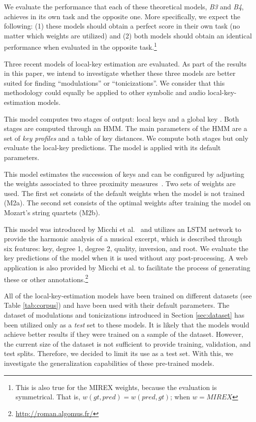 We evaluate the performance that each of these theoretical
models, \emph{B3} and \emph{B4}, achieves in its own task
and the opposite one. More specifically, we expect the
following: (1) these models should obtain a perfect score in
their own task (no matter which weights are utilized) and
(2) both models should obtain an identical performance when
evaluated in the opposite task.\footnote{This is also true
for the MIREX weights, because the evaluation is
symmetrical. That is, $w(gt, pred) = w(pred, gt)$; when
$w=MIREX$}

Three recent models of local-key estimation are evaluated.
As part of the results in this paper, we intend to
investigate whether these three models are better suited for
finding ``modulations'' or ``tonicizations''. We consider
that this methodology could equally be applied to other
symbolic and audio local-key-estimation models.

 This model computes
two stages of output: local keys and a global key
\cite{napoleslopez2019key}. Both stages are computed through
an HMM. The main parameters of the HMM are a set of
\emph{key profiles} and a table of key distances. We compute
both stages but only evaluate the local-key predictions. The
model is applied with its default parameters.

This model estimates the succession of keys and can be
configured by adjusting the weights associated to three
proximity measures~\cite{feisthauer2020smc}. Two sets of
weights are used. The first set consists of the default
weights when the model is not trained (M2a). The second set
consists of the optimal weights after training the model on
Mozart's string quartets (M2b).

This model was introduced by Micchi et
al.~\cite{micchi20roman} and utilizes an LSTM network to
provide the harmonic analysis of a musical excerpt, which is
described through six features: key, degree 1, degree 2,
quality, inversion, and root. We evaluate the key
predictions of the model when it is used without any
post-processing. A web application is also provided by
Micchi et al. to facilitate the process of generating these
or other
annotations.\footnote{\url{http://roman.algomus.fr/}}

All of the local-key-estimation models have been trained on
different datasets (see Table \ref{tab:corpus}) and have
been used with their default parameters. The dataset of
modulations and tonicizations introduced in Section
\ref{sec:dataset} has been utilized only as a \emph{test}
set to these models. It is likely that the models would
achieve better results if they were trained on a sample of
the dataset. However, the current size of the dataset is not
sufficient to provide training, validation, and test splits.
Therefore, we decided to limit its use as a test set. With
this, we investigate the generalization capabilities of
these pre-trained models.

